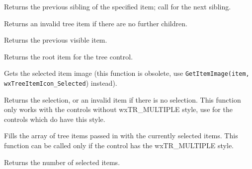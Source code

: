 
Returns the previous sibling of the specified item; call  for the next sibling.

Returns an invalid tree item if there are no further children.




\label{wxtreectrlgetprevvisible}


Returns the previous visible item.


\label{wxtreectrlgetrootitem}


Returns the root item for the tree control.


\label{wxtreectrlgetitemselectedimage}


Gets the selected item image (this function is obsolete, use
{\tt GetItemImage(item, wxTreeItemIcon\_Selected}) instead).


\label{wxtreectrlgetselection}


Returns the selection, or an invalid item if there is no selection.
This function only works with the controls without wxTR\_MULTIPLE style, use
 for the controls which do have
this style.


\label{wxtreectrlgetselections}


Fills the array of tree items passed in with the currently selected items. This
function can be called only if the control has the wxTR\_MULTIPLE style.

Returns the number of selected items.


